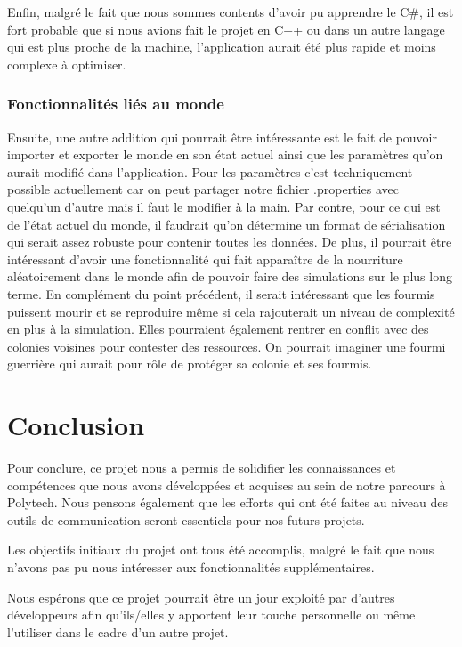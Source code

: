 \documentclass{EPUProjetDi}
\begin{document}
Enfin, malgré le fait que nous sommes contents d'avoir pu apprendre le C\#, il est fort probable que si nous avions fait le projet en C++ 
ou dans un autre langage qui est plus proche de la machine, l'application aurait été plus rapide et moins complexe à optimiser.


\subsection{Fonctionnalités liés au monde}
Ensuite, une autre addition qui pourrait être intéressante est le fait de pouvoir importer et exporter le monde en son état actuel ainsi que les paramètres qu'on aurait modifié dans l'application.
Pour les paramètres c'est techniquement possible actuellement car on peut partager notre fichier .properties avec quelqu'un d'autre mais il faut le modifier à la main. 
Par contre, pour ce qui est de l'état actuel du monde, il faudrait qu'on détermine un format de sérialisation qui serait assez robuste pour contenir toutes les données.
De plus, il pourrait être intéressant d'avoir une fonctionnalité qui fait apparaître de la nourriture aléatoirement dans le monde afin de pouvoir faire des simulations sur le plus long terme.
En complément du point précédent, il serait intéressant que les fourmis puissent mourir et se reproduire même si cela rajouterait un niveau de complexité en plus à la simulation. 
Elles pourraient également rentrer en conflit avec des colonies voisines pour contester des ressources. On pourrait imaginer une fourmi guerrière qui aurait pour rôle de protéger sa colonie et ses fourmis.

\chapter*{Conclusion}

Pour conclure, ce projet nous a permis de solidifier les connaissances et compétences que nous avons développées et acquises au sein de notre parcours à Polytech.
Nous pensons également que les efforts qui ont été faites au niveau des outils de communication seront essentiels pour nos futurs projets.

Les objectifs initiaux du projet ont tous été accomplis, malgré le fait que nous n'avons pas pu nous intéresser aux fonctionnalités supplémentaires.

Nous espérons que ce projet pourrait être un jour exploité par d'autres développeurs afin qu'ils/elles y apportent leur touche personnelle ou même l'utiliser dans le cadre d'un autre projet.
\end{document}
